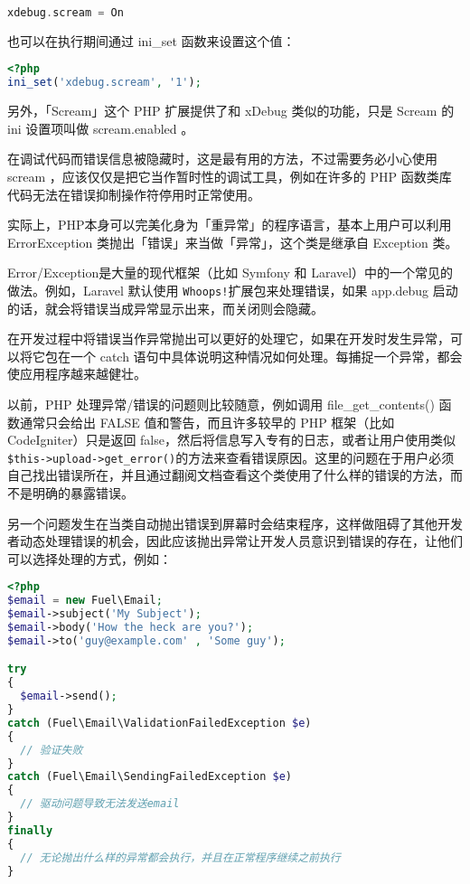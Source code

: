 \begin{lstlisting}[language=PHP]
xdebug.scream = On
\end{lstlisting}

也可以在执行期间通过 ini\_set 函数来设置这个值：


\begin{lstlisting}[language=PHP]
<?php
ini_set('xdebug.scream', '1');
\end{lstlisting}

另外，「Scream」这个 PHP 扩展提供了和 xDebug 类似的功能，只是 Scream 的 ini 设置项叫做 scream.enabled 。

在调试代码而错误信息被隐藏时，这是最有用的方法，不过需要务必小心使用 scream ，应该仅仅是把它当作暂时性的调试工具，例如在许多的 PHP 函数类库代码无法在错误抑制操作符停用时正常使用。


实际上，PHP本身可以完美化身为「重异常」的程序语言，基本上用户可以利用 ErrorException 类抛出「错误」来当做「异常」，这个类是继承自 Exception 类。

Error/Exception是大量的现代框架（比如 Symfony 和 Laravel）中的一个常见的做法。例如，Laravel 默认使用 \texttt{Whoops!}扩展包来处理错误，如果 app.debug 启动的话，就会将错误当成异常显示出来，而关闭则会隐藏。

在开发过程中将错误当作异常抛出可以更好的处理它，如果在开发时发生异常，可以将它包在一个 catch 语句中具体说明这种情况如何处理。每捕捉一个异常，都会使应用程序越来越健壮。


以前，PHP 处理异常/错误的问题则比较随意，例如调用 file\_get\_contents() 函数通常只会给出 FALSE 值和警告，而且许多较早的 PHP 框架（比如 CodeIgniter）只是返回 false，然后将信息写入专有的日志，或者让用户使用类似\texttt{\$this->upload->get\_error()}的方法来查看错误原因。这里的问题在于用户必须自己找出错误所在，并且通过翻阅文档查看这个类使用了什么样的错误的方法，而不是明确的暴露错误。

另一个问题发生在当类自动抛出错误到屏幕时会结束程序，这样做阻碍了其他开发者动态处理错误的机会，因此应该抛出异常让开发人员意识到错误的存在，让他们可以选择处理的方式，例如：




\begin{lstlisting}[language=PHP]
<?php
$email = new Fuel\Email;
$email->subject('My Subject');
$email->body('How the heck are you?');
$email->to('guy@example.com' , 'Some guy');

try 
{
  $email->send();
}
catch (Fuel\Email\ValidationFailedException $e)
{
  // 验证失败
}
catch (Fuel\Email\SendingFailedException $e) 
{
  // 驱动问题导致无法发送email
}
finally
{
  // 无论抛出什么样的异常都会执行，并且在正常程序继续之前执行
}
\end{lstlisting}





